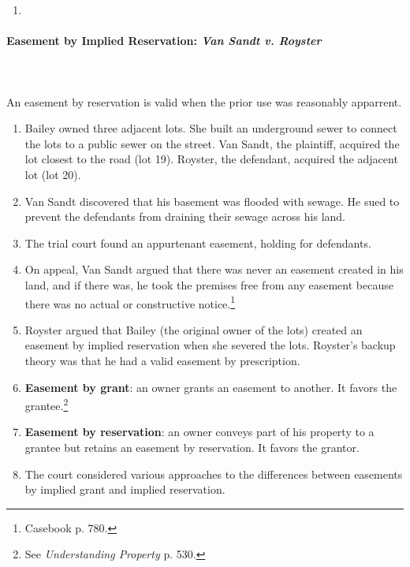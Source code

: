 \begin{enumerate}
    \item %
\end{enumerate}

\newpage %

\paragraph{Easement by Implied Reservation: \emph{Van Sandt v. Royster}}
~\\\\
An easement by reservation is valid when the prior use was reasonably 
apparrent.

\begin{enumerate}
    \item Bailey owned three adjacent lots. She built an underground sewer to 
    connect the lots to a public sewer on the street. Van Sandt, the 
    plaintiff, acquired the lot closest to the road (lot 19). Royster, the 
    defendant, acquired the adjacent lot (lot 20).
    \item Van Sandt discovered that his basement was flooded with sewage. He 
    sued to prevent the defendants from draining their sewage across his land.
    \item The trial court found an appurtenant easement, holding for 
    defendants.
    \item On appeal, Van Sandt argued that there was never an easement 
    created in his land, and if there was, he took the premises free from any 
    easement because there was no actual or constructive 
    notice.\footnote{Casebook p. 780.}
    \item Royster argued that Bailey (the original owner of the lots) created 
    an easement by implied reservation when she severed the lots. Royster's 
    backup theory was that he had a valid easement by prescription.
    \item \textbf{Easement by grant}: an owner grants an easement to another. 
    It favors the grantee.\footnote{See \emph{Understanding Property} p. 530.}
    \item \textbf{Easement by reservation}: an owner conveys part of his 
    property to a grantee but retains an easement by reservation. It favors 
    the grantor.
    \item The court considered various approaches to the differences between 
    easements by implied grant and implied reservation.
    \begin{enumerate}

\end{enumerate}
\end{enumerate}
